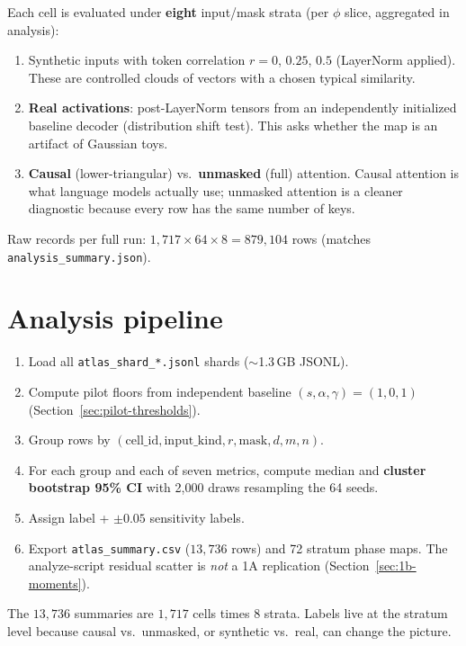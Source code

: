 \documentclass[11pt,a4paper]{report}
\begin{document}
Each cell is evaluated under \textbf{eight} input/mask strata (per $\phi$ slice, aggregated in analysis):
\begin{enumerate}[leftmargin=*]
  \item Synthetic inputs with token correlation $r=0$, $0.25$, $0.5$ (LayerNorm applied). These are controlled clouds of vectors with a chosen typical similarity.
  \item \textbf{Real activations}: post-LayerNorm tensors from an independently initialized baseline decoder (distribution shift test). This asks whether the map is an artifact of Gaussian toys.
  \item \textbf{Causal} (lower-triangular) vs.\ \textbf{unmasked} (full) attention. Causal attention is what language models actually use; unmasked attention is a cleaner diagnostic because every row has the same number of keys.
\end{enumerate}

Raw records per full run: $1{,}717\times 64\times 8 = 879{,}104$ rows (matches \texttt{analysis\_summary.json}).

\section{Analysis pipeline}

\begin{enumerate}[leftmargin=*]
  \item Load all \texttt{atlas\_shard\_*.jsonl} shards ($\sim$1.3\,GB JSONL).
  \item Compute pilot floors from independent baseline $(s,\alpha,\gamma)=(1,0,1)$ (Section~\ref{sec:pilot-thresholds}).
  \item Group rows by $(\mathrm{cell\_id},\mathrm{input\_kind},r,\mathrm{mask},d,m,n)$.
  \item For each group and each of seven metrics, compute median and \textbf{cluster bootstrap 95\% CI} with 2{,}000 draws resampling the 64 seeds.
  \item Assign label + $\pm 0.05$ sensitivity labels.
  \item Export \texttt{atlas\_summary.csv} ($13{,}736$ rows) and 72 stratum phase maps. The analyze-script residual scatter is \emph{not} a 1A replication (Section~\ref{sec:1b-moments}).
\end{enumerate}

The $13{,}736$ summaries are $1{,}717$ cells times 8 strata. Labels live at the stratum level because causal vs.\ unmasked, or synthetic vs.\ real, can change the picture.
\end{document}
